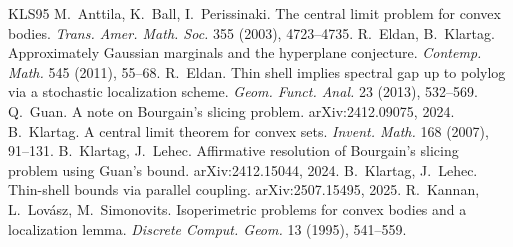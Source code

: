 \documentclass[10pt]{article}
\begin{document}
\begin{thebibliography}{KLS95}\small
{} M.~Anttila, K.~Ball, I.~Perissinaki. The central limit problem for convex bodies. \emph{Trans. Amer. Math. Soc.} 355 (2003), 4723--4735.
 R.~Eldan, B.~Klartag. Approximately Gaussian marginals and the hyperplane conjecture. \emph{Contemp. Math.} 545 (2011), 55--68.
 R.~Eldan. Thin shell implies spectral gap up to polylog via a stochastic localization scheme. \emph{Geom. Funct. Anal.} 23 (2013), 532--569.
 Q.~Guan. A note on Bourgain's slicing problem. arXiv:2412.09075, 2024.
 B.~Klartag. A central limit theorem for convex sets. \emph{Invent. Math.} 168 (2007), 91--131.
 B.~Klartag, J.~Lehec. Affirmative resolution of Bourgain's slicing problem using Guan's bound. arXiv:2412.15044, 2024.
 B.~Klartag, J.~Lehec. Thin-shell bounds via parallel coupling. arXiv:2507.15495, 2025.
 R.~Kannan, L.~Lov\'asz, M.~Simonovits. Isoperimetric problems for convex bodies and a localization lemma. \emph{Discrete Comput. Geom.} 13 (1995), 541--559.
\end{thebibliography}
\end{document}
